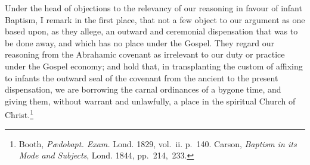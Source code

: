 \documentclass[
]{book}
\begin{document}
Under the head of objections to the relevancy of our reasoning in favour of infant Baptism, I remark in the first place, that not a few object to our argument as one based upon, as they allege, an outward and ceremonial dispensation that was to be done away, and which has no place under the Gospel. They regard our reasoning from the Abrahamic covenant as irrelevant to our duty or practice under the Gospel economy; and hold that, in transplanting the custom of affixing to infants the outward seal of the covenant from the ancient to the present dispensation, we are borrowing the carnal ordinances of a bygone time, and giving them, without warrant and unlawfully, a place in the spiritual Church of Christ.\footnote{Booth, \emph{Pædobapt. Exam.} Lond. 1829, vol.~ii. p.~140. Carson, \emph{Baptism in its Mode and Subjects}, Lond. 1844, pp.~214,~233.}
\end{document}
